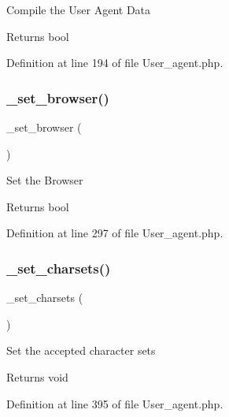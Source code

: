 Compile the User Agent Data

\begin{DoxyReturn}{Returns}
bool 
\end{DoxyReturn}


Definition at line 194 of file User\+\_\+agent.\+php.

\mbox{\label{class_c_i___user__agent_a6788d0353e44d81a1214fe367ebce0f5}} 
\subsubsection{\texorpdfstring{\_set\_browser()}{\_set\_browser()}}
{\footnotesize\ttfamily \+\_\+set\+\_\+browser (\begin{DoxyParamCaption}{ }\end{DoxyParamCaption})\hspace{0.3cm}{\ttfamily [protected]}}

Set the Browser

\begin{DoxyReturn}{Returns}
bool 
\end{DoxyReturn}


Definition at line 297 of file User\+\_\+agent.\+php.

\mbox{\label{class_c_i___user__agent_ae97780ac0ec104137f47641061288f3c}} 
\subsubsection{\texorpdfstring{\_set\_charsets()}{\_set\_charsets()}}
{\footnotesize\ttfamily \+\_\+set\+\_\+charsets (\begin{DoxyParamCaption}{ }\end{DoxyParamCaption})\hspace{0.3cm}{\ttfamily [protected]}}

Set the accepted character sets

\begin{DoxyReturn}{Returns}
void 
\end{DoxyReturn}


Definition at line 395 of file User\+\_\+agent.\+php.

